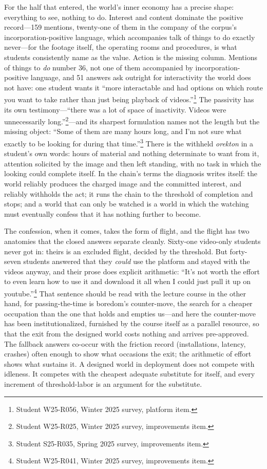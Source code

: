 For the half that entered, the world's inner economy has a precise shape: everything to see, nothing to do. Interest and content dominate the positive record---159 mentions, twenty-one of them in the company of the corpus's incorporation-positive language, which accompanies talk of things to do exactly never---for the footage itself, the operating rooms and procedures, is what students consistently name as the value. Action is the missing column. Mentions of things to \textit{do} number 36, not one of them accompanied by incorporation-positive language, and 51 answers ask outright for interactivity the world does not have: one student wants it ``more interactable and had options on which route you want to take rather than just being playback of videos.''\footnote{Student W25-R056, Winter 2025 survey, platform item.} The passivity has its own testimony---``there was a lot of space of inactivity. Videos were unnecessarily long.''\footnote{Student W25-R025, Winter 2025 survey, improvements item.}---and its sharpest formulation names not the length but the missing object: ``Some of them are many hours long, and I'm not sure what exactly to be looking for during that time.''\footnote{Student S25-R035, Spring 2025 survey, improvements item.} There is the withheld \textit{orekton} in a student's own words: hours of material and nothing determinate to want from it, attention solicited by the image and then left standing, with no task in which the looking could complete itself. In the chain's terms the diagnosis writes itself: the world reliably produces the charged image and the committed interest, and reliably withholds the act; it runs the chain to the threshold of completion and stops; and a world that can only be watched is a world in which the watching must eventually confess that it has nothing further to become.

The confession, when it comes, takes the form of flight, and the flight has two anatomies that the closed answers separate cleanly. Sixty-one video-only students never got in: theirs is an excluded flight, decided by the threshold. But forty-seven students answered that they \textit{could} use the platform and stayed with the videos anyway, and their prose does explicit arithmetic: ``It's not worth the effort to even learn how to use it and download it all when I could just pull it up on youtube.''\footnote{Student W25-R041, Winter 2025 survey, improvements item.} That sentence should be read with the lecture course in the other hand, for passing-the-time is boredom's counter-move, the search for a cheaper occupation than the one that holds and empties us---and here the counter-move has been institutionalized, furnished by the course itself as a parallel resource, so that the exit from the designed world costs nothing and arrives pre-approved. The fallback answers co-occur with the friction record (installations, latency, crashes) often enough to show what occasions the exit; the arithmetic of effort shows what sustains it. A designed world in deployment does not compete with idleness. It competes with the cheapest adequate substitute for itself, and every increment of threshold-labor is an argument for the substitute.

